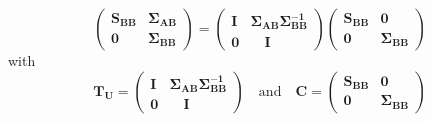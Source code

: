 \documentclass[openany]{book}
\begin{document}
$$
 \left( \begin{array}{ll} \mathbf{S_{BB}}  & \mathbf{\Sigma_{AB}}
	\\ \mathbf{0} & \mathbf{\Sigma_{BB}}  \end{array}
\right) 
 =  \left( \begin{array}{ll} 
	\mathbf{I} &  \mathbf{\Sigma_{AB}} \mathbf{\Sigma_{BB}^{-1}}
	\\ \mathbf{0} & \quad \mathbf{I} \quad
\end{array}
\right)
\left( \begin{array}{ll} 
	\mathbf{S_{BB}}   & \mathbf{0}\\ 
	\mathbf{0}  & \mathbf{\Sigma_{BB}}
\end{array} \right)
$$
with
$$ \mathbf{T_U} =
\left( \begin{array}{ll} 
	\mathbf{I} &  \mathbf{\Sigma_{AB}} \mathbf{\Sigma_{BB}^{-1}}
	\\ \mathbf{0} & \quad \mathbf{I} \quad
\end{array}
\right)  \quad \text{and} \quad \mathbf{C} =
\left( \begin{array}{ll} 
	\mathbf{S_{BB}}   & \mathbf{0}\\ 
	\mathbf{0}  & \mathbf{\Sigma_{BB}}
\end{array} \right) 
$$
\end{document}

